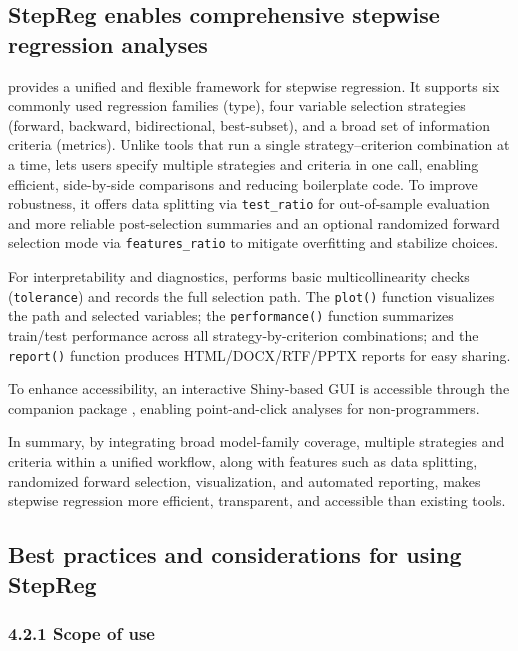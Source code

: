 \subsection{StepReg enables comprehensive stepwise regression analyses}\label{stepreg-enables-comprehensive-stepwise-regression-analyses}

 provides a unified and flexible framework for stepwise regression. It supports six commonly used regression families (type), four variable selection strategies (forward, backward, bidirectional, best-subset), and a broad set of information criteria (metrics). Unlike tools that run a single strategy--criterion combination at a time,  lets users specify multiple strategies and criteria in one call, enabling efficient, side-by-side comparisons and reducing boilerplate code. To improve robustness, it offers data splitting via \texttt{test\_ratio} for out-of-sample evaluation and more reliable post-selection summaries and an optional randomized forward selection mode via \texttt{features\_ratio} to mitigate overfitting and stabilize choices.

For interpretability and diagnostics,  performs basic multicollinearity checks (\texttt{tolerance}) and records the full selection path. The \texttt{plot()} function visualizes the path and selected variables; the \texttt{performance()} function summarizes train/test performance across all strategy-by-criterion combinations; and the \texttt{report()} function produces HTML/DOCX/RTF/PPTX reports for easy sharing.

To enhance accessibility, an interactive Shiny-based GUI is accessible through the companion package , enabling point-and-click analyses for non-programmers.

In summary, by integrating broad model-family coverage, multiple strategies and criteria within a unified workflow, along with features such as data splitting, randomized forward selection, visualization, and automated reporting,  makes stepwise regression more efficient, transparent, and accessible than existing tools.

\subsection{Best practices and considerations for using StepReg}\label{best-practices-and-considerations-for-using-stepreg}

\subsubsection{4.2.1 Scope of use}\label{scope-of-use}

